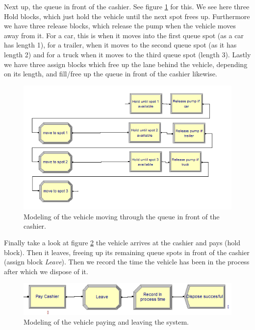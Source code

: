 Next up, the queue in front of the cashier. See figure \ref{fig:cashierqueue} for this. We see here three Hold blocks, which just hold the vehicle until the next spot frees up. Furthermore we have three release blocks, which release the pump when the vehicle moves away from it. For a car, this is when it moves into the first queue spot (as a car has length 1), for a trailer, when it moves to the second queue spot (as it has length 2) and for a truck when it moves to the third queue spot (length 3). Lastly we have three assign blocks which free up the lane behind the vehicle, depending on its length, and fill/free up the queue in front of the cashier likewise.

\begin{figure}[]
\begin{center}
	\includegraphics[scale=1]{images/model-description/cashier-queue.PNG}
	\caption{Modeling of the vehicle moving through the queue in front of the cashier.}
	\label{fig:cashierqueue}
\end{center}
\end{figure}

Finally take a look at figure \ref{fig:payleave} the vehicle arrives at the cashier and pays (hold block). Then it leaves, freeing up its remaining queue spots in front of the cashier (assign block \textit{Leave}). Then we record the time the vehicle has been in the process after which we dispose of it.

\begin{figure}[]
\begin{center}
	\includegraphics[scale=1]{images/model-description/pay-and-leave.PNG}
	\caption{Modeling of the vehicle paying and leaving the system.}
	\label{fig:payleave}
\end{center}
\end{figure}